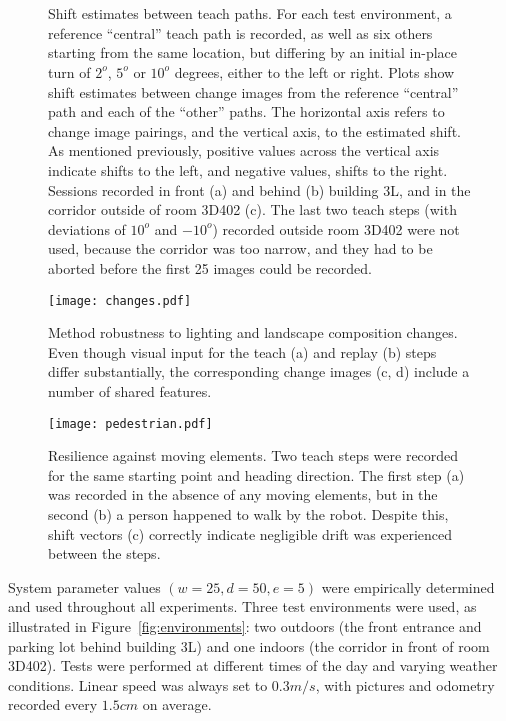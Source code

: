 \documentclass[twocolumn, 9pt,fleqn]{jsproceedings}
\begin{document}
\begin{figure}[h!]
\\
\\
\caption{Shift estimates between teach paths. For each test environment, a reference ``central'' teach path is recorded, as well as six others starting from the same location, but differing by an initial in-place turn of $2^o$, $5^o$ or $10^o$ degrees, either to the left or right. Plots show shift estimates between change images from the reference ``central'' path and each of the ``other'' paths. The horizontal axis refers to change image pairings, and the vertical axis, to the estimated shift. As mentioned previously, positive values across the vertical axis indicate shifts to the left, and negative values, shifts to the right. Sessions recorded in front (a) and behind (b) building 3L, and in the corridor outside of room 3D402 (c). The last two teach steps (with deviations of $10^o$ and $-10^o$) recorded outside room 3D402 were not used, because the corridor was too narrow, and they had to be aborted before the first 25 images could be recorded.}
\label{fig:tests_turn}
\end{figure}

\begin{figure}[h!]
\centering
\texttt{[image: changes.pdf]}
\caption{Method robustness to lighting and landscape composition changes. Even though visual input for the teach (a) and replay (b) steps differ substantially, the corresponding change images (c, d) include a number of shared features.}
\label{fig:changes}
\end{figure}

\begin{figure}[h!]
\texttt{[image: pedestrian.pdf]}
\caption{Resilience against moving elements. Two teach steps were recorded for the same starting point and heading direction. The first step (a) was recorded in the absence of any moving elements, but in the second (b) a person happened to walk by the robot. Despite this, shift vectors (c) correctly indicate negligible drift was experienced between the steps.}
\label{fig:pedestrian}
\end{figure}

System parameter values $(w = 25, d = 50, e = 5)$ were empirically determined and used throughout all experiments. Three test environments were used, as illustrated in Figure~\ref{fig:environments}: two outdoors (the front entrance and parking lot behind building 3L) and one indoors (the corridor in front of room 3D402). Tests were performed at different times of the day and varying weather conditions. Linear speed was always set to $0.3m/s$, with pictures and odometry recorded every $1.5cm$ on average.
\end{document}
